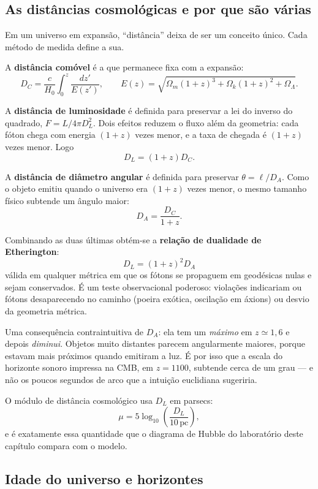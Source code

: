 \documentclass[11pt,a4paper]{article}
\begin{document}
\subsection*{As distâncias cosmológicas e por que são várias}

Em um universo em expansão, ``distância'' deixa de ser um conceito único. Cada método de medida define a sua.

A \textbf{distância comóvel} é a que permanece fixa com a expansão:
\[
D_C=\frac{c}{H_0}\int_0^{z}\frac{dz'}{E(z')},
\qquad
E(z)=\sqrt{\Omega_{m}(1+z)^{3}+\Omega_{k}(1+z)^{2}+\Omega_{\Lambda}}.
\]

A \textbf{distância de luminosidade} é definida para preservar a lei do inverso do quadrado, $F=L/4\pi D_L^{2}$. Dois efeitos reduzem o fluxo além da geometria: cada fóton chega com energia $(1+z)$ vezes menor, e a taxa de chegada é $(1+z)$ vezes menor. Logo
\[
D_L=(1+z)D_C.
\]

A \textbf{distância de diâmetro angular} é definida para preservar $\theta=\ell/D_A$. Como o objeto emitiu quando o universo era $(1+z)$ vezes menor, o mesmo tamanho físico subtende um ângulo maior:
\[
D_A=\frac{D_C}{1+z}.
\]

Combinando as duas últimas obtém-se a \textbf{relação de dualidade de Etherington}:
\[
\boxed{\ D_L=(1+z)^{2}D_A\ }
\]
válida em qualquer métrica em que os fótons se propaguem em geodésicas nulas e sejam conservados. É um teste observacional poderoso: violações indicariam ou fótons desaparecendo no caminho (poeira exótica, oscilação em áxions) ou desvio da geometria métrica.

Uma consequência contraintuitiva de $D_A$: ela tem um \emph{máximo} em $z\simeq1{,}6$ e depois \emph{diminui}. Objetos muito distantes parecem angularmente maiores, porque estavam mais próximos quando emitiram a luz. É por isso que a escala do horizonte sonoro impressa na CMB, em $z=1100$, subtende cerca de um grau --- e não os poucos segundos de arco que a intuição euclidiana sugeriria.

O módulo de distância cosmológico usa $D_L$ em parsecs:
\[
\mu=5\log_{10}\left(\frac{D_L}{10\,\mathrm{pc}}\right),
\]
e é exatamente essa quantidade que o diagrama de Hubble do laboratório deste capítulo compara com o modelo.

\subsection*{Idade do universo e horizontes}
\end{document}
